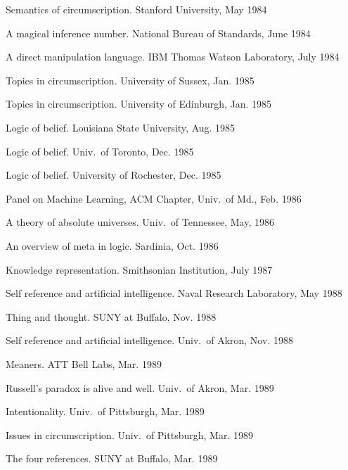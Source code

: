 {%





\expar
Semantics of circumscription. Stanford University, May 1984

\expar
A magical inference number. National Bureau of Standards, June 1984

\expar
A direct manipulation language. IBM Thomas Watson Laboratory, July 1984

\expar
Topics in circumscription. University of Sussex, Jan. 1985

\expar
Topics in circumscription. University of Edinburgh, Jan. 1985

\expar
Logic of belief. Louisiana State University, Aug. 1985

\expar
Logic of belief. Univ.~of Toronto, Dec. 1985

\expar
Logic of belief. University of Rochester, Dec. 1985

\expar
Panel on Machine Learning, ACM Chapter, Univ.~of Md., Feb. 1986

\expar
A theory of absolute universes. Univ.~of Tennessee, May, 1986

\expar
An overview of meta in logic. Sardinia, Oct. 1986

\expar
Knowledge representation. Smithsonian Institution, July 1987

\expar
Self reference and artificial intelligence. Naval Research Laboratory, May 
1988

\expar
Thing and thought. SUNY at Buffalo, Nov. 1988

\expar
Self reference and artificial intelligence. Univ.~of Akron, Nov. 1988

\expar
Meaners. ATT Bell Labs, Mar. 1989

\expar
Russell's paradox is alive and well.
Univ.~of Akron, Mar. 1989

\expar
Intentionality. Univ.~of Pittsburgh, Mar. 1989

\expar
Issues in circumscription. Univ.~of Pittsburgh, Mar. 1989

\expar
The four references. SUNY at Buffalo, Mar. 1989

}
